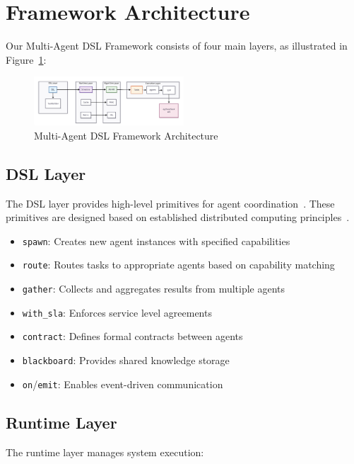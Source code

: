 \documentclass[conference]{IEEEtran}
\begin{document}
\section{Framework Architecture}

Our Multi-Agent DSL Framework consists of four main layers, as illustrated in Figure~\ref{fig:architecture}:

\begin{figure}[htbp]
\centering
\includegraphics[width=0.5\textwidth]{images/system_architecture.png}
\caption{Multi-Agent DSL Framework Architecture}
\label{fig:architecture}
\end{figure}

\subsection{DSL Layer}

The DSL layer provides high-level primitives for agent coordination~\cite{herlihy2012art,attiya2004distributed}. These primitives are designed based on established distributed computing principles~\cite{musa2004software}.

\begin{itemize}
\item \texttt{spawn}: Creates new agent instances with specified capabilities
\item \texttt{route}: Routes tasks to appropriate agents based on capability matching
\item \texttt{gather}: Collects and aggregates results from multiple agents
\item \texttt{with\_sla}: Enforces service level agreements
\item \texttt{contract}: Defines formal contracts between agents
\item \texttt{blackboard}: Provides shared knowledge storage
\item \texttt{on}/\texttt{emit}: Enables event-driven communication
\end{itemize}

\subsection{Runtime Layer}

The runtime layer manages system execution:
\end{document}
